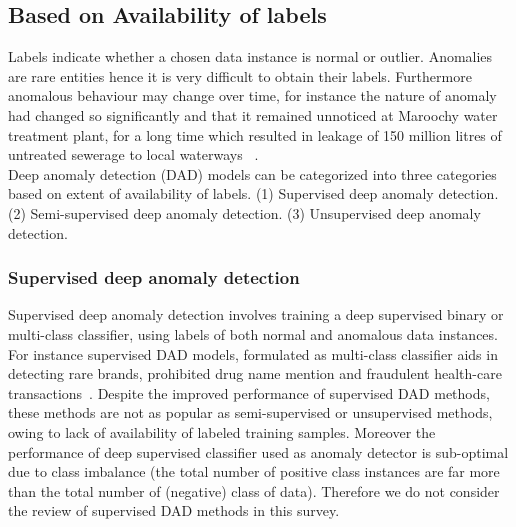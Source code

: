 \subsection{Based on Availability of labels}
Labels indicate whether a chosen data instance is normal or outlier. Anomalies are rare entities hence it is very  difficult to obtain their labels. Furthermore anomalous behaviour may change over time, for instance  the nature of anomaly had changed so significantly and that it  remained unnoticed at Maroochy water treatment plant, for a long time which resulted in leakage of 150 million litres of untreated sewerage to local waterways ~\cite{ramotsoela2018survey}.\\
Deep anomaly detection (DAD) models can be categorized into three categories based on extent of availability of labels. (1) Supervised deep anomaly detection. (2) Semi-supervised deep anomaly detection. (3) Unsupervised deep anomaly detection.

\subsubsection{Supervised deep anomaly detection}
\label{supervised_learning}
Supervised deep anomaly detection involves training a deep supervised binary or multi-class classifier, using labels of both normal and anomalous data instances. For instance supervised DAD models, formulated as multi-class classifier aids in detecting rare brands, prohibited drug name mention and fraudulent health-care transactions~\cite{chalapathy2016investigation,chalapathy2016bidirectional}.
Despite the improved performance of supervised DAD methods, these methods are not as popular as semi-supervised or unsupervised methods, owing to lack of availability of labeled training samples. Moreover the performance of deep supervised classifier used as anomaly detector is sub-optimal due to class imbalance (the total number of positive class instances are far more than the total number of (negative) class of data). Therefore we do not consider the review of supervised DAD methods in this survey.

